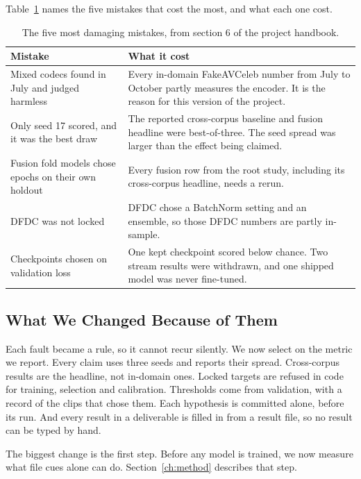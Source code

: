 Table~\ref{tab:mistakes} names the five mistakes that cost the most, and what
each one cost.

\begin{table}[ht]
    \centering
    \small
    \caption{The five most damaging mistakes, from section 6 of the project handbook.}
    \label{tab:mistakes}
    \begin{tabularx}{\textwidth}{@{}>{\raggedright\arraybackslash}p{4.2cm}X@{}}
        \toprule
        \textbf{Mistake} & \textbf{What it cost} \\
        \midrule
        Mixed codecs found in July and judged harmless & Every in-domain FakeAVCeleb number from July to October partly measures the encoder. It is the reason for this version of the project. \\
        Only seed 17 scored, and it was the best draw & The reported cross-corpus baseline and fusion headline were best-of-three. The seed spread was larger than the effect being claimed. \\
        Fusion fold models chose epochs on their own holdout & Every fusion row from the root study, including its cross-corpus headline, needs a rerun. \\
        DFDC was not locked & DFDC chose a BatchNorm setting and an ensemble, so those DFDC numbers are partly in-sample. \\
        Checkpoints chosen on validation loss & One kept checkpoint scored below chance. Two stream results were withdrawn, and one shipped model was never fine-tuned. \\
        \bottomrule
    \end{tabularx}
\end{table}

\subsection{What We Changed Because of Them}

Each fault became a rule, so it cannot recur silently. We now select on the
metric we report. Every claim uses three seeds and reports their spread.
Cross-corpus results are the headline, not in-domain ones. Locked targets are
refused in code for training, selection and calibration. Thresholds come from
validation, with a record of the clips that chose them. Each hypothesis is
committed alone, before its run. And every result in a deliverable is filled
in from a result file, so no result can be typed by hand.

The biggest change is the first step. Before any model is trained, we now
measure what file cues alone can do. Section~\ref{ch:method} describes that step.

